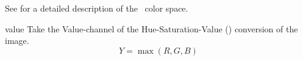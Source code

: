 \begin{codelist}
\begin{codelist}
    See  for a detailed
    description of the ~color space.

  \item[value]\itemend Take the Value-channel of the
    Hue-Saturation-Value () conversion of the image.
    \[
    Y = \max(R, G, B)
    \]
  \end{codelist}
\end{codelist}


